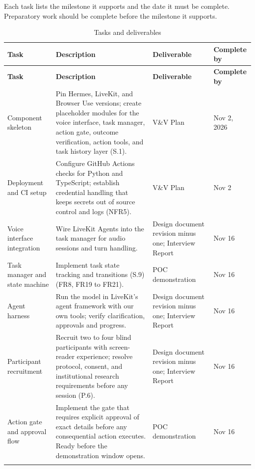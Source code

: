 \documentclass{scrreprt}
\theoremstyle{definition}
\begin{document}
Each task lists the milestone it supports and the date it must be complete. Preparatory work should be complete before the milestone it supports.

\begingroup
\small
\begin{xltabular}{\textwidth}{>{\raggedright\arraybackslash}p{2.8cm}>{\raggedright\arraybackslash}X>{\raggedright\arraybackslash}p{3cm}>{\raggedright\arraybackslash}p{2.2cm}}
\caption{Tasks and deliverables}\label{tab:tasks}\\
\toprule
\textbf{Task} & \textbf{Description} & \textbf{Deliverable} & \textbf{Complete by}\\
\midrule
\endfirsthead
\toprule
\textbf{Task} & \textbf{Description} & \textbf{Deliverable} & \textbf{Complete by}\\
\midrule
\endhead
\bottomrule
\endfoot
Component skeleton & Pin Hermes, LiveKit, and Browser Use versions; create placeholder modules for the voice interface, task manager, action gate, outcome verification, action tools, and task history layer (S.1). & V\&V Plan & Nov 2, 2026\\\addlinespace[4pt]
Deployment and CI setup & Configure GitHub Actions checks for Python and TypeScript; establish credential handling that keeps secrets out of source control and logs (NFR5). & V\&V Plan & Nov 2\\\addlinespace[4pt]
Voice interface integration & Wire LiveKit Agents into the task manager for audio sessions and turn handling. & Design document revision minus one; Interview Report & Nov 16\\\addlinespace[4pt]
Task manager and state machine & Implement task state tracking and transitions (S.9) (FR8, FR19 to FR21). & POC demonstration & Nov 16\\\addlinespace[4pt]
Agent harness & Run the model in LiveKit's agent framework with our own tools; verify clarification, approvals and progress. & Design document revision minus one; Interview Report & Nov 16\\\addlinespace[4pt]
Participant recruitment & Recruit two to four blind participants with screen-reader experience; resolve protocol, consent, and institutional research requirements before any session (P.6). & Design document revision minus one; Interview Report & Nov 16\\\addlinespace[4pt]
Action gate and approval flow & Implement the gate that requires explicit approval of exact details before any consequential action executes. Ready before the demonstration window opens. & POC demonstration & Nov 16\\\addlinespace[4pt]

\end{xltabular}
\end{document}
